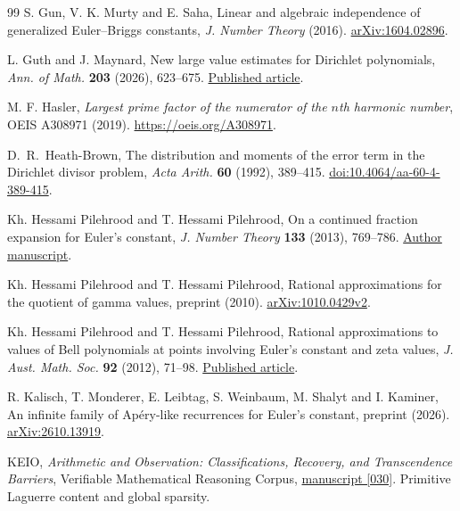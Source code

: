 \documentclass[11pt,a4paper,oneside,openany]{report}
\theoremstyle{remark}\newtheorem{remark}[theorem]{Remark}
\numberwithin{equation}{section}
\begin{document}
\begin{thebibliography}{99}
 S. Gun, V. K. Murty and E. Saha, Linear and algebraic independence of generalized Euler--Briggs constants, \emph{J. Number Theory} (2016). \href{https://arxiv.org/abs/1604.02896}{arXiv:1604.02896}.

 L. Guth and J. Maynard, New large value estimates for Dirichlet polynomials, \emph{Ann. of Math.} \textbf{203} (2026), 623--675. \href{https://annals.math.princeton.edu/2026/203-2/p06}{Published article}.

 M. F. Hasler, \emph{Largest prime factor of the numerator of the $n$th harmonic number}, OEIS A308971 (2019). \url{https://oeis.org/A308971}.

 D.~R.~Heath-Brown, The distribution and moments of the error term in the Dirichlet divisor problem, \emph{Acta Arith.} \textbf{60} (1992), 389--415. \href{https://doi.org/10.4064/aa-60-4-389-415}{doi:10.4064/aa-60-4-389-415}.

 Kh. Hessami Pilehrood and T. Hessami Pilehrood, On a continued fraction expansion for Euler's constant, \emph{J. Number Theory} \textbf{133} (2013), 769--786. \href{https://arxiv.org/abs/1010.1420}{Author manuscript}.

 Kh. Hessami Pilehrood and T. Hessami Pilehrood, Rational approximations for the quotient of gamma values, preprint (2010). \href{https://arxiv.org/abs/1010.0429}{arXiv:1010.0429v2}.

 Kh. Hessami Pilehrood and T. Hessami Pilehrood, Rational approximations to values of Bell polynomials at points involving Euler's constant and zeta values, \emph{J. Aust. Math. Soc.} \textbf{92} (2012), 71--98. \href{https://doi.org/10.1017/S1446788712000134}{Published article}.

 R. Kalisch, T. Monderer, E. Leibtag, S. Weinbaum, M. Shalyt and I. Kaminer, An infinite family of Ap\'ery-like recurrences for Euler's constant, preprint (2026). \href{https://arxiv.org/abs/2610.13919}{arXiv:2610.13919}.

 KEIO, \emph{Arithmetic and Observation: Classifications, Recovery, and Transcendence Barriers}, Verifiable Mathematical Reasoning Corpus, \href{https://github.com/QEEDDD/Verifiable-Mathematical-Reasoning-Corpus/blob/c2ac34ea4622778187173f41bb1996deee8081b7/\%5B030\%5D\%20Arithmetic\%20and\%20Observation\%20Classifications\%2C\%20Recovery\%2C\%20and\%20Transcendence\%20Barriers.tex\#L27212}{manuscript [030]}. Primitive Laguerre content and global sparsity.


\end{thebibliography}
\end{document}
